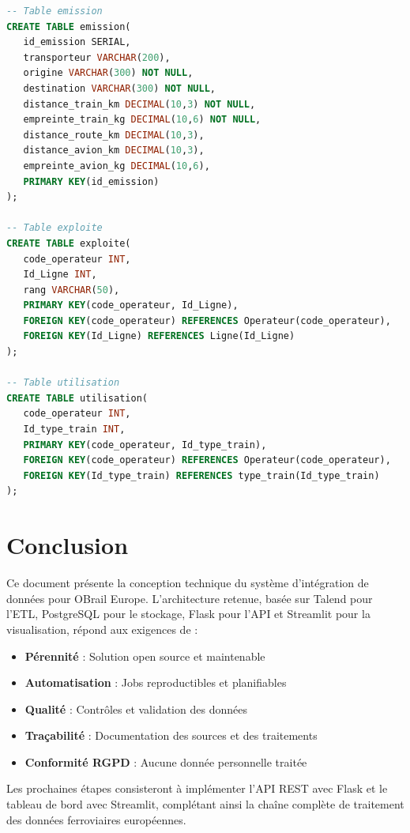 \documentclass[12pt,a4paper]{article}
\begin{document}
\begin{lstlisting}[language=SQL, caption=Script SQL complet de création des tables]
-- Table emission
CREATE TABLE emission(
   id_emission SERIAL,
   transporteur VARCHAR(200),
   origine VARCHAR(300) NOT NULL,
   destination VARCHAR(300) NOT NULL,
   distance_train_km DECIMAL(10,3) NOT NULL,
   empreinte_train_kg DECIMAL(10,6) NOT NULL,
   distance_route_km DECIMAL(10,3),
   distance_avion_km DECIMAL(10,3),
   empreinte_avion_kg DECIMAL(10,6),
   PRIMARY KEY(id_emission)
);

-- Table exploite
CREATE TABLE exploite(
   code_operateur INT,
   Id_Ligne INT,
   rang VARCHAR(50),
   PRIMARY KEY(code_operateur, Id_Ligne),
   FOREIGN KEY(code_operateur) REFERENCES Operateur(code_operateur),
   FOREIGN KEY(Id_Ligne) REFERENCES Ligne(Id_Ligne)
);

-- Table utilisation
CREATE TABLE utilisation(
   code_operateur INT,
   Id_type_train INT,
   PRIMARY KEY(code_operateur, Id_type_train),
   FOREIGN KEY(code_operateur) REFERENCES Operateur(code_operateur),
   FOREIGN KEY(Id_type_train) REFERENCES type_train(Id_type_train)
);
\end{lstlisting}

\section{Conclusion}

Ce document présente la conception technique du système d'intégration de données pour OBrail Europe. L'architecture retenue, basée sur Talend pour l'ETL, PostgreSQL pour le stockage, Flask pour l'API et Streamlit pour la visualisation, répond aux exigences de :

\begin{itemize}
    \item \textbf{Pérennité} : Solution open source et maintenable
    \item \textbf{Automatisation} : Jobs reproductibles et planifiables
    \item \textbf{Qualité} : Contrôles et validation des données
    \item \textbf{Traçabilité} : Documentation des sources et des traitements
    \item \textbf{Conformité RGPD} : Aucune donnée personnelle traitée
\end{itemize}

Les prochaines étapes consisteront à implémenter l'API REST avec Flask et le tableau de bord avec Streamlit, complétant ainsi la chaîne complète de traitement des données ferroviaires européennes.
\end{document}
